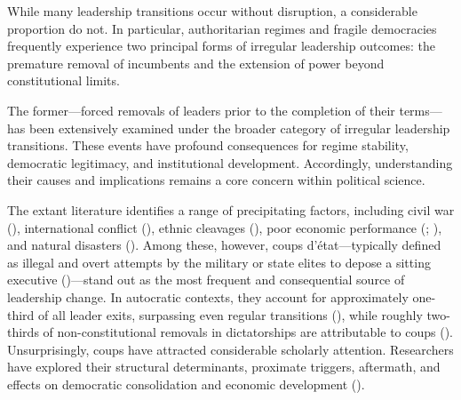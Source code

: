 \documentclass[
  12pt,
]{report}
\begin{document}
While many leadership transitions occur without disruption, a
considerable proportion do not. In particular, authoritarian regimes and
fragile democracies frequently experience two principal forms of
irregular leadership outcomes: the premature removal of incumbents and
the extension of power beyond constitutional limits.

The former---forced removals of leaders prior to the completion of their
terms---has been extensively examined under the broader category of
irregular leadership transitions. These events have profound
consequences for regime stability, democratic legitimacy, and
institutional development. Accordingly, understanding their causes and
implications remains a core concern within political science.

The extant literature identifies a range of precipitating factors,
including civil war (), international conflict (), ethnic cleavages
(), poor
economic performance (;
), and natural
disasters (). Among these, however, coups d'état---typically defined as
illegal and overt attempts by the military or state elites to depose a
sitting executive ()---stand out as the most frequent and consequential source of
leadership change. In autocratic contexts, they account for
approximately one-third of all leader exits, surpassing even regular
transitions (), while
roughly two-thirds of non-constitutional removals in dictatorships are
attributable to coups ().
Unsurprisingly, coups have attracted considerable scholarly attention.
Researchers have explored their structural determinants, proximate
triggers, aftermath, and effects on democratic consolidation and
economic development ().
\end{document}
